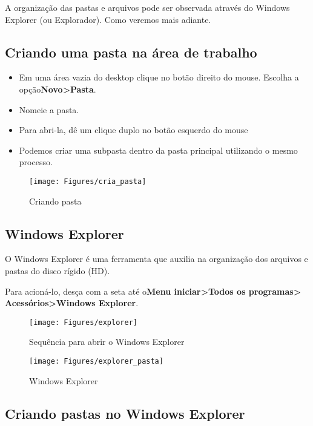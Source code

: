 \documentclass[12pt]{article}
\begin{document}
	A organização das pastas e arquivos pode ser observada através do Windows Explorer (ou Explorador). Como veremos mais adiante.
	
	\subsection{Criando uma pasta na área de trabalho}
	
	\begin{itemize}
		\item Em uma área vazia do desktop clique no botão direito do mouse. Escolha a opção{\bf Novo>Pasta}.
		\item Nomeie a pasta.
		\item Para abri-la, dê um clique duplo no botão esquerdo do mouse
		\item Podemos criar uma subpasta dentro da pasta principal utilizando o mesmo processo.
	\end{itemize}
	
		\begin{figure}[!h]
			\centering
			\texttt{[image: Figures/cria\_pasta]}
			\caption{Criando pasta}
			\label{fig:criando pasta}
		\end{figure}
		
	\subsection{Windows Explorer}
	
		O Windows Explorer é uma ferramenta que auxilia na organização dos arquivos e pastas do disco rígido (HD).	
		
		Para acioná-lo, desça com a seta até o{\bf Menu iniciar>Todos os programas> Acessórios>Windows Explorer}.
	
		\begin{figure}[!h]
			\centering
			\texttt{[image: Figures/explorer]}
			\caption{Sequência para abrir o Windows Explorer}
			\label{fig:explorer}
		\end{figure}
		
			
			\begin{figure}[!h]
				\centering
				\texttt{[image: Figures/explorer\_pasta]}
				\caption{Windows Explorer}
				\label{fig:explorer_p}
			\end{figure}
			
		\newpage	
		\subsection{Criando pastas no Windows Explorer}
		
\end{document}
